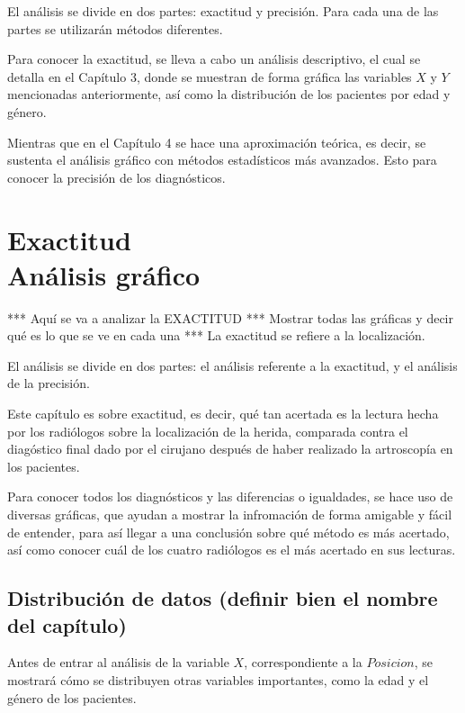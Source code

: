 \documentclass[11pt]{book}
\newcommand{\forceindent}{\leavevmode{\parindent=2em\indent}} %
\begin{document}
		\forceindent El análisis se divide en dos partes: exactitud y precisión. Para cada una de las partes se utilizarán métodos diferentes. 	
			
		\forceindent Para conocer la exactitud, se lleva a cabo un análisis descriptivo, el cual se detalla en el Capítulo 3, donde se muestran de forma gráfica las variables $X$ y $Y$ mencionadas anteriormente, así como la distribución de los pacientes por edad y género.
		
		\forceindent Mientras que en el Capítulo 4 se hace una aproximación teórica, es decir, se sustenta el análisis gráfico con métodos estadísticos más avanzados. Esto para conocer la precisión de los diagnósticos.
		
			
			
			
			
		
			
	\chapter{Exactitud \\Análisis gráfico}  %
	\doublespacing 
	*** Aquí se va a analizar la EXACTITUD
	*** Mostrar todas las gráficas y decir qué es lo que se ve en cada una		
	*** La exactitud se refiere a la localización.	
		
	\forceindent El análisis se divide en dos partes: el análisis referente a la exactitud, y el análisis de la precisión.	
	
	\forceindent Este capítulo es sobre exactitud, es decir, qué tan acertada es la lectura hecha por los radiólogos sobre la localización de la herida, comparada contra el diagóstico final dado por el cirujano después de haber realizado la artroscopía en los pacientes.
	
	\forceindent Para conocer todos los diagnósticos y las diferencias o igualdades, se hace uso de diversas gráficas, que ayudan a mostrar la infromación de forma amigable y fácil de entender, para así llegar a una conclusión sobre qué método es más acertado, así como conocer cuál de los cuatro radiólogos es el más acertado en sus lecturas.
	
	\section{Distribución de datos (definir bien el nombre del capítulo)}
	\forceindent Antes de entrar al análisis de la variable $X$, correspondiente a la $Posicion$, se mostrará cómo se distribuyen otras variables importantes, como la edad y el género de los pacientes.
	
\end{document}
